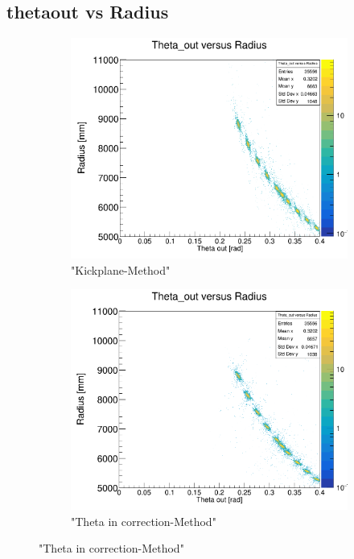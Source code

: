 \documentclass[12pt, letterpaper]{article}
\begin{document}
\subsection{theta\textunderscore out vs Radius}
\begin{figure}[!htbp]
\begin{subfigure}{.5\textwidth}
  \centering
  \includegraphics[width=.9\linewidth]{plot_imgs/theta_out_rho_get_centr.png}  
  \caption{"Kickplane-Method"}
  \label{fig:sub-first}
\end{subfigure}
\begin{subfigure}{.5\textwidth}
  \centering
  \includegraphics[width=.9\linewidth]{plot_imgs/theta_out_rho_corr.png} 
  \caption{"Theta \textunderscore in correction-Method"}
  \label{fig:sub-second}

\end{subfigure}
\end{figure}
\end{document}
